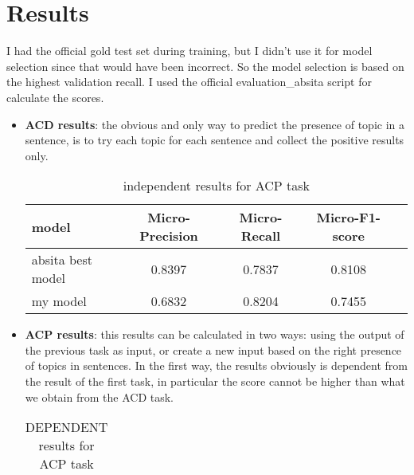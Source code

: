 \documentclass{article}
\begin{document}
    \section{Results}\label{sec:s5}
        I had the official gold test set during training, but I didn't use it for model selection since that would have been incorrect.
        So the model selection is based on the highest validation recall.
        I used the official evaluation\_absita script for calculate the scores.
        \begin{itemize}
            \item \textbf{ACD results}: the obvious and only way to predict the presence of topic in a sentence, is to try each topic for each sentence and collect the positive results only.
                \begin{table}[h!]
                    \begin{center}
                        \caption{independent results for ACP task}
                        \label{tab:table2}
                        \begin{tabular}{l|c|c|c|r}
                            \textbf{model} & \textbf{Micro-Precision} & \textbf{Micro-Recall} & \textbf{Micro-F1-score}\\
                            \hline
                                absita best model & 0.8397 & 0.7837 & 0.8108\\
                                my model & 0.6832 & 0.8204 & 0.7455\\
                        \end{tabular}
                    \end{center}
                \end{table}
            \item \textbf{ACP results}: this results can be calculated in two ways: using the output of the previous task as input, or create a new input based on the right presence of topics in sentences.
                In the first way, the results obviously is dependent from the result of the first task, in particular the score cannot be higher than what we obtain from the ACD task.
                \begin{table}[h!]
                    \begin{center}
                        \caption{DEPENDENT results for ACP task}
                        \label{tab:table3}
                        \begin{tabular}{l|c|c|r}

\end{tabular}
\end{center}
\end{table}
\end{itemize}
\end{document}
